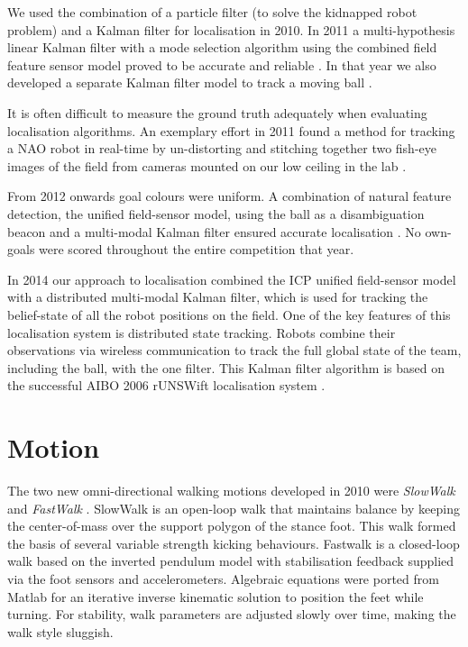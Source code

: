 \documentclass[runningheads,a4paper]{llncs}
\begin{document}
We used the combination of a particle filter (to solve the kidnapped robot problem) and a Kalman filter for localisation in 2010. In 2011 a multi-hypothesis linear Kalman filter with a mode selection algorithm using the combined field feature sensor model proved to be accurate and reliable \cite{claridge2011multihypothesiskf}. In that year we also developed a separate Kalman filter model to track a moving ball \cite{teh2011ballmodelling}. 

It is often difficult to measure the ground truth adequately when evaluating localisation algorithms. An exemplary effort in 2011 found a method for tracking a NAO robot in real-time by un-distorting and stitching together two fish-eye images of the field from cameras mounted on our low ceiling in the lab \cite{jisarojito2011trackingoverhead}.

From 2012 onwards goal colours were uniform. A combination of natural feature detection, the unified field-sensor model, using the ball as a disambiguation beacon and a multi-modal Kalman filter ensured accurate localisation \cite{hunter2012localisation}.  No own-goals were scored throughout the entire competition that year.

In 2014 our approach to localisation combined the ICP unified field-sensor model with a distributed multi-modal Kalman filter, which is used for tracking the belief-state of all the robot positions on the field. One of the key features of this localisation system is distributed state tracking. Robots combine their observations via wireless communication to track the full global state of the team, including the ball, with the one filter. This Kalman filter algorithm is based on the successful AIBO 2006 rUNSWift localisation system  \cite{sushkov2006robotlocalisation}.






\section{Motion}
The two new omni-directional walking motions developed in 2010 were \emph{SlowWalk} and \emph{FastWalk} \cite{cse10rUNSWift2010}.  SlowWalk is an open-loop walk that maintains balance by keeping the center-of-mass over the support polygon of the stance foot. This walk formed the basis of several variable strength kicking behaviours. Fastwalk is a closed-loop walk based on the inverted pendulum model with stabilisation feedback supplied via the foot sensors and accelerometers. Algebraic equations were ported from Matlab for an iterative inverse kinematic solution to position the feet while turning. For stability, walk parameters are adjusted slowly over time, making the walk style sluggish.  
\end{document}
